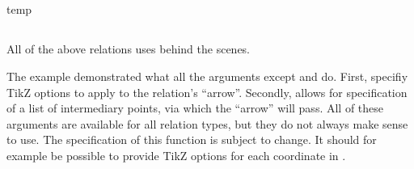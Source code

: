 \documentclass[a4paper,10pt]{article}
\begin{document}
\begin{figure}[H]
  \centering
  
\end{figure}


\subsection{}

\begin{filecontents*}{temp}
\end{filecontents*}

\begin{figure}[H]
  \centering
  
\end{figure}


\subsection{}

All of the above relations uses  behind the scenes.

\vspace{1em}

The  example demonstrated what all the arguments except  and  do. First,  specifiy TikZ options to apply to the relation's ``arrow''. Secondly,  allows for specification of a list of intermediary points, via which the ``arrow'' will pass. All of these arguments are available for all relation types, but they do not always make sense to use. The specification of this function is subject to change. It should for example be possible to provide TikZ options for each coordinate in .
\end{document}
